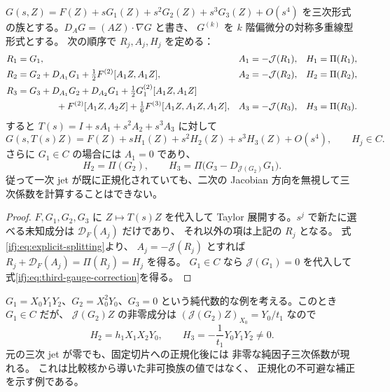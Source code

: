 \begin{proposition}
\label{ifj:prop:explicit-third-normalization}
$G(s,Z)=F(Z)+sG_1(Z)+s^2G_2(Z)+s^3G_3(Z)+O(s^4)$
を三次形式の族とする。$D_AG=(AZ)\cdot\nabla G$ と書き、
$G^{(k)}$ を $k$ 階偏微分の対称多重線型形式とする。
次の順序で $R_j,A_j,H_j$ を定める：
\begin{align*}
 R_1&=G_1,& A_1&=-\mathcal J(R_1),&H_1&=\Pi(R_1),\\
 R_2&=G_2+D_{A_1}G_1
             +\tfrac12F^{(2)}[A_1Z,A_1Z],
       & A_2&=-\mathcal J(R_2),&H_2&=\Pi(R_2),\\
 R_3&=G_3+D_{A_1}G_2+D_{A_2}G_1
             +\tfrac12G_1^{(2)}[A_1Z,A_1Z]\\
    &\hspace{15mm}
       +F^{(2)}[A_1Z,A_2Z]
             +\tfrac16F^{(3)}[A_1Z,A_1Z,A_1Z],
       & A_3&=-\mathcal J(R_3),&H_3&=\Pi(R_3).
\end{align*}
すると $T(s)=I+sA_1+s^2A_2+s^3A_3$ に対して
\begin{equation}\label{ifj:eq:third-normalized}
 G(s,T(s)Z)=F(Z)+sH_1(Z)+s^2H_2(Z)+s^3H_3(Z)+O(s^4),
 \qquad H_j\in C.
\end{equation}
さらに $G_1\in C$ の場合には $A_1=0$ であり、
\begin{equation}\label{ifj:eq:third-gauge-correction}
 H_2=\Pi(G_2),\qquad
 H_3=\Pi\bigl(G_3-D_{\mathcal J(G_2)}G_1\bigr).
\end{equation}
従って一次 jet が既に正規化されていても、二次の
Jacobian 方向を無視して三次係数を計算することはできない。
\end{proposition}

\begin{proof}
$F,G_1,G_2,G_3$ に $Z\mapsto T(s)Z$ を代入して
Taylor 展開する。$s^j$ で新たに選べる未知成分は
$\mathcal D_F(A_j)$ だけであり、
それ以外の項は上記の $R_j$ となる。
式\eqref{ifj:eq:explicit-splitting}より、
$A_j=-\mathcal J(R_j)$ とすれば
$R_j+\mathcal D_F(A_j)=\Pi(R_j)=H_j$ を得る。
$G_1\in C$ なら $\mathcal J(G_1)=0$ を代入して
式\eqref{ifj:eq:third-gauge-correction}を得る。
\end{proof}

\begin{example}[二次座標補正から現れる非零三次項]
\label{ifj:ex:third-coordinate-artifact}
$G_1=X_0Y_1Y_2$、$G_2=X_0^2Y_0$、$G_3=0$
という純代数的な例を考える。このとき $G_1\in C$ だが、
$\mathcal J(G_2)Z$ の非零成分は
$(\mathcal J(G_2)Z)_{X_0}=Y_0/t_1$ なので
\[
 H_2=h_1X_1X_2Y_0,\qquad
 H_3=-\frac1{t_1}Y_0Y_1Y_2\ne0.
\]
元の三次 jet が零でも、固定切片への正規化後には
非零な純因子三次係数が現れる。
これは比較核から導いた非可換族の値ではなく、
正規化の不可避な補正を示す例である。
\end{example}

